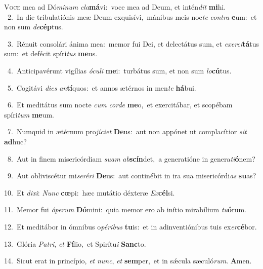 \lettrine{\initial\textcolor{\initialcolor}{V}}{oce} mea ad Dó\-\textit{mi}\-\textit{num} \textit{cla}\-\textbf{má}vi:~\star voce mea ad Deum, et intén\textit{dit} \textbf{mi}\-hi.\\
{\numbfont\textcolor{\numbcolor}{~2.}}~In die tribulatiónis meæ Deum exquisívi,~\dagger mánibus meis noc\textit{te} \textit{con}\-\textit{tra} \textbf{e}\-um:~\star et non sum \textit{de}\-\textbf{cép}tus.\par
{\numbfont\textcolor{\numbcolor}{~3.}}~Rénuit consolári ánima mea:~\dagger memor fui Dei, et delectátus sum, et \textit{ex}\-\textit{er}\textit{ci}\textbf{tá}tus sum:~\star et defécit spíri\textit{tus} \textbf{me}\-us.\par
{\numbfont\textcolor{\numbcolor}{~4.}}~Anticipavérunt vigílias \textit{ó}\-\textit{cu}\textit{li} \textbf{me}\-i:~\star turbátus sum, et non sum \textit{lo}\-\textbf{cú}tus.\par
{\numbfont\textcolor{\numbcolor}{~5.}}~Cogitávi \textit{di}\-\textit{es} \textit{an}\-\textbf{tí}quos:~\star et annos ætérnos in men\textit{te} \textbf{há}\-bui.\par
{\numbfont\textcolor{\numbcolor}{~6.}}~Et meditátus sum nocte \textit{cum} \textit{cor}\-\textit{de} \textbf{me}\-o,~\star et exercitábar, et scopébam spíri\textit{tum} \textbf{me}\-um.\par
{\numbfont\textcolor{\numbcolor}{~7.}}~Numquid in ætérnum pro\-\textit{jí}\-\textit{ci}\textit{et} \textbf{De}\-us:~\star aut non appónet ut complacítior \textit{sit} \textbf{ad}\-huc?\par
{\numbfont\textcolor{\numbcolor}{~8.}}~Aut in finem misericórdiam \textit{su}\-\textit{am} \textit{ab}\-\textbf{scín}det,~\star a generatióne in genera\-\textit{ti}\-\textbf{ó}nem?\par
{\numbfont\textcolor{\numbcolor}{~9.}}~Aut obliviscétur mi\-\textit{se}\-\textit{ré}\textit{ri} \textbf{De}\-us:~\star aut continébit in ira sua misericórdi\textit{as} \textbf{su}\-as?\par
{\numbfont\textcolor{\numbcolor}{10.}}~Et \textit{di}\-\textit{xi}: \textit{Nunc} \textbf{cœ}\-pi:~\star hæc mutátio déxteræ \textit{Ex}\-\textbf{cél}si.\par
{\numbfont\textcolor{\numbcolor}{11.}}~Memor fui \textit{ó}\-\textit{pe}\textit{rum} \textbf{Dó}\-mini:~\star quia memor ero ab inítio mirabílium \textit{tu}\-\textbf{ó}rum.\par
{\numbfont\textcolor{\numbcolor}{12.}}~Et meditábor in ómnibus o\-\textit{pé}\-\textit{ri}\textit{bus} \textbf{tu}\-is:~\star et in adinventiónibus tuis ex\-\textit{er}\-\textbf{cé}bor.\par
{\numbfont\textcolor{\numbcolor}{13.}}~Glória \textit{Pa}\-\textit{tri}, \textit{et} \textbf{Fí}\-lio,~\star et Spirítu\textit{i} \textbf{Sanc}\-to.\par
{\numbfont\textcolor{\numbcolor}{14.}}~Sicut erat in princípio, \textit{et} \textit{nunc}\-, \textit{et} \textbf{sem}\-per,~\star et in sǽcula sæculó\-\textit{rum}\-. \textbf{A}\-men.\par
